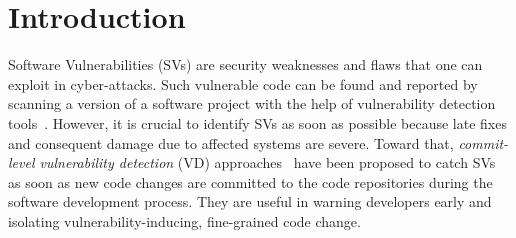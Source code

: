 \section{Introduction}
\label{intro:sec}


Software Vulnerabilities (SVs) are security weaknesses and flaws that one can exploit in cyber-attacks.
Such vulnerable code can be found and reported by scanning a version of a software project with the help of vulnerability detection tools~\cite{li2018vuldeepecker,zhou2019devign,li2021sysevr}.
However, it is crucial to identify SVs as
soon as possible because late fixes and consequent damage due to affected systems are severe.
Toward that, {\em commit-level vulnerability
  detection} (VD)
approaches~\cite{perl2015vccfinder,zhou2017automated,chen2019large}
have been proposed to catch SVs as soon as new code changes are
committed to the code repositories during
the software development process. They are useful in warning
developers early and isolating vulnerability-inducing, fine-grained code change.




